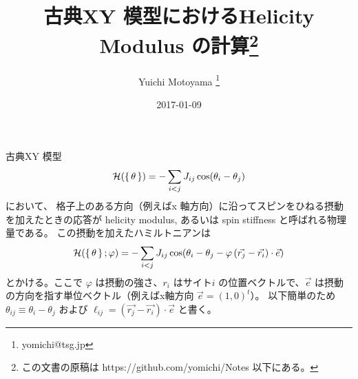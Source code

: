 \documentclass{jsarticle}
\title{古典XY 模型におけるHelicity Modulus の計算\thanks{この文書の原稿は https://github.com/yomichi/Notes 以下にある。}}
\author{Yuichi Motoyama \thanks{yomichi@tsg.jp}}
\date{2017-01-09}
\begin{document}
\maketitle

古典XY 模型
\begin{equation}
  \mathcal{H}(\set{\theta}) = - \sum_{i<j} J_{ij} \cos(\theta_i - \theta_j)
\end{equation}
において、
格子上のある方向（例えばx 軸方向）に沿ってスピンをひねる摂動を加えたときの応答が helicity modulus, あるいは spin stiffness と呼ばれる物理量である。
この摂動を加えたハミルトニアンは
\begin{equation}
  \mathcal{H}(\set{\theta}; \varphi) = - \sum_{i<j} J_{ij} \cos(\theta_i - \theta_j - \varphi \left(\vec{r_j} - \vec{r_i}\right)\cdot \vec{e})
\end{equation}
とかける。ここで $\varphi$ は摂動の強さ、$r_i$ はサイト$i$ の位置ベクトルで、$\vec{e}$ は摂動の方向を指す単位ベクトル（例えばx軸方向 $\vec{e} = (1, 0)^t$）。
以下簡単のため $\theta_{ij} \equiv \theta_i - \theta_j$ および $\ell_{ij} = \left(\vec{r_j}-\vec{r_i}\right)\cdot \vec{e}$ と書く。
\end{document}
